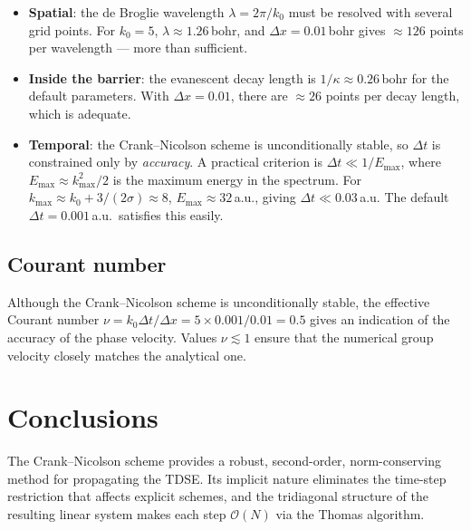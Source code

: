 \documentclass[12pt, a4paper]{article}
\newcommand{\dt}{\Delta t}
\newcommand{\dx}{\Delta x}
\newcommand{\CN}{Crank--Nicolson}
\begin{document}
\begin{itemize}
  \item \textbf{Spatial}: the de Broglie wavelength $\lambda = 2\pi/k_0$
        must be resolved with several grid points.  For $k_0 = 5$,
        $\lambda \approx 1.26$\,bohr, and $\dx = 0.01$\,bohr gives
        $\approx 126$ points per wavelength — more than sufficient.

  \item \textbf{Inside the barrier}: the evanescent decay length is
        $1/\kappa \approx 0.26$\,bohr for the default parameters.
        With $\dx = 0.01$, there are $\approx 26$ points per decay length,
        which is adequate.

  \item \textbf{Temporal}: the \CN{} scheme is unconditionally stable, so
        $\dt$ is constrained only by \emph{accuracy}.  A practical
        criterion is $\dt \ll 1/E_\text{max}$, where
        $E_\text{max} \approx k_\text{max}^2/2$ is the maximum energy in
        the spectrum.  For $k_\text{max} \approx k_0 + 3/(2\sigma)
        \approx 8$, $E_\text{max} \approx 32$\,a.u., giving
        $\dt \ll 0.03$\,a.u.  The default $\dt = 0.001$\,a.u.\ satisfies
        this easily.
\end{itemize}

\subsection{Courant number}

Although the \CN{} scheme is unconditionally stable, the effective
Courant number $\nu = k_0\dt/\dx = 5 \times 0.001 / 0.01 = 0.5$
gives an indication of the accuracy of the phase velocity.  Values
$\nu \lesssim 1$ ensure that the numerical group velocity closely
matches the analytical one.

\section{Conclusions}

The \CN{} scheme provides a robust, second-order, norm-conserving method
for propagating the TDSE.  Its implicit nature eliminates the time-step
restriction that affects explicit schemes, and the tridiagonal structure
of the resulting linear system makes each step $\mathcal{O}(N)$ via the
Thomas algorithm.
\end{document}

